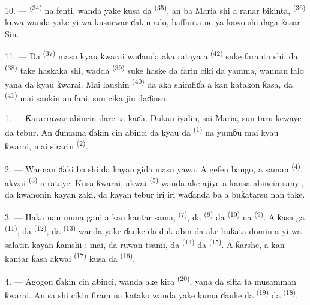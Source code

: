 10. ---  \textsuperscript{(34)} na fenti,
wanda yake kusa da  \textsuperscript{(35)}, an ba
Maria shi a ranar bikinta, 
\textsuperscript{(36)} kuwa wanda yake yi wa kusurwar ɗakin ado, baffanta
ne ya kawo shi daga ƙasar Sin.

11. --- Da  \textsuperscript{(37)} masu kyau ƙwarai
waɗanda aka rataya a  \textsuperscript{(42)} suke faranta
shi, da  \textsuperscript{(38)} take haskaka shi,
wadda  \textsuperscript{(39)} suke haske da
farin ciki da yamma, wannan falo yana da kyau ƙwarai. Mai laushin
 \textsuperscript{(40)} da aka shimfiɗa a kan katakon
ƙasa, da  \textsuperscript{(41)} mai saukin
amfani, sun cika jin daɗinsa.

\VUsaut{3.6mm}
\VUsaut{3.0mm}

1. --- Ƙararrawar abincin dare ta kaɗa. Dukan iyalin, sai Maria, sun
taru kewaye da tebur. An ɗumama ɗakin cin abinci da kyau da
 \textsuperscript{(1)} na yumɓu mai kyau ƙwarai, mai
sirarin  \textsuperscript{(2)}.

2. --- Wannan ɗaki ba shi da kayan gida masu yawa. A gefen bango, a
saman  \textsuperscript{(4)}, akwai
 \textsuperscript{(3)} a rataye. Kusa ƙwarai, akwai
 \textsuperscript{(5)} wanda ake ajiye a kansa
abincin sanyi, da kwanonin kayan zaki, da kayan tebur iri iri waɗanda
ba a buƙatarsu nan take.

3. --- Haka nan muna gani a kan kantar sama,  \textsuperscript{(7)}, da  \textsuperscript{(8)} da
 \textsuperscript{(10)} na 
\textsuperscript{(9)}. A ƙasa ga  \textsuperscript{(11)}, da
 \textsuperscript{(12)}, da 
\textsuperscript{(13)} wanda yake ɗauke da duk abin da ake buƙata domin
a yi wa salatin kayan ƙamshi : mai, da ruwan tsami, da
 \textsuperscript{(14)} da 
\textsuperscript{(15)}. A ƙarshe, a kan kantar ƙasa akwai
 \textsuperscript{(17)} kusa da 
\textsuperscript{(16)}.

4. --- Agogon ɗakin cin abinci, wanda ake kira 
\textsuperscript{(20)}, yana da siffa ta musamman ƙwarai. An sa shi
cikin firam na katako wanda yake kuma ɗauke da  \textsuperscript{(19)} da 
\textsuperscript{(18)}.

